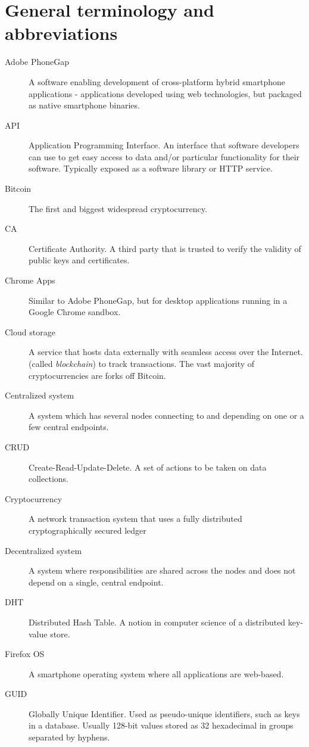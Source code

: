 \section*{General terminology and abbreviations}

\begin{description}
  \item[Adobe PhoneGap] A software enabling development of cross-platform hybrid smartphone applications - applications developed using web technologies, but packaged as native smartphone binaries.
  \item[API] Application Programming Interface. An interface that software developers can use to get easy access to data and/or particular functionality for their software. Typically exposed as a software library or HTTP service.
  \item[Bitcoin] The first and biggest widespread cryptocurrency.
  \item[CA] Certificate Authority. A third party that is trusted to verify the validity of public keys and certificates.
  \item[Chrome Apps] Similar to Adobe PhoneGap, but for desktop applications running in a Google Chrome sandbox.
  \item[Cloud storage] A service that hosts data externally with seamless access over the Internet.
   (called \emph{blockchain}) to track transactions. The vast majority of cryptocurrencies are forks off Bitcoin.
  \item[Centralized system] A system which has several nodes connecting to and depending on one or a few central endpoints.
  \item[CRUD] Create-Read-Update-Delete. A set of actions to be taken on data collections.
  \item[Cryptocurrency] A network transaction system that uses a fully distributed cryptographically secured ledger
  \item[Decentralized system] A system where responsibilities are shared across the nodes and does not depend on a single, central endpoint.
  \item[DHT] Distributed Hash Table. A notion in computer science of a distributed key-value store.
  \item[Firefox OS] A smartphone operating system where all applications are web-based.
  \item[GUID] Globally Unique Identifier. Used as pseudo-unique identifiers, such as keys in a database. Usually 128-bit values stored as 32 hexadecimal in groups separated by hyphens.

\end{description}

